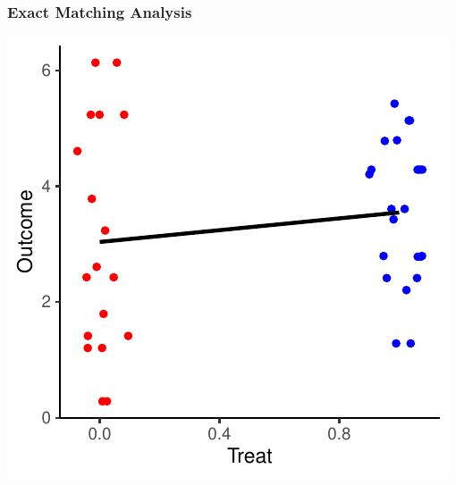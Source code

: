 \documentclass[xcolor=x11names,compress]{beamer}\usepackage[]{graphicx}\usepackage[]{color}
\makeatletter
\def\maxwidth{ %
  \ifdim\Gin@nat@width>\linewidth
    \linewidth
  \else
    \Gin@nat@width
  \fi
}
\newenvironment{knitrout}{}{} %
\renewcommand{\(}{\begin{columns}}
\renewcommand{\)}{\end{columns}}
\newcommand{\<}[1]{\begin{column}{#1}}
\renewcommand{\>}{\end{column}}
\makeatother
\begin{document}
\begin{frame}
\frametitle{Exact Matching Analysis}
\begin{center}
\begin{knitrout}
\color{fgcolor}
\includegraphics[width=\maxwidth]{figure/exact_matching_analysis0b-1} 

\end{knitrout}
\end{center}
\end{frame}
\end{document}
